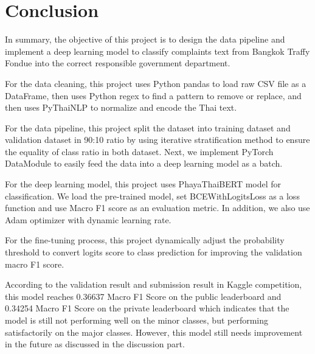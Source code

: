 \documentclass[12pt, a4paper]{article}
\begin{document}
    \pagebreak

    \part{Conclusion}
        In summary, the objective of this project is to design the data pipeline and implement a deep learning model to classify
        complaints text from Bangkok Traffy Fondue into the correct responsible government department.

        \vspace{1em}

        For the data cleaning, this project uses Python pandas to load raw CSV file as a DataFrame,
        then uses Python regex to find a pattern to remove or replace, and then uses PyThaiNLP to normalize
        and encode the Thai text.

        \vspace{1em}

        For the data pipeline, this project split the dataset into training dataset and validation dataset in 90:10 ratio
        by using iterative stratification method to ensure the equality of class ratio in both dataset.
        Next, we implement PyTorch DataModule to easily feed the data into a deep learning model as a batch.

        \vspace{1em}

        For the deep learning model, this project uses PhayaThaiBERT model for classification. We load the pre-trained model,
        set BCEWithLogitsLoss as a loss function and use Macro F1 score as an evaluation metric.
        In addition, we also use Adam optimizer with dynamic learning rate.

        \vspace{1em}

        For the fine-tuning process, this project dynamically adjust the probability threshold to convert logits score to class prediction
        for improving the validation macro F1 score.

        \vspace{1em}
        According to the validation result and submission result in Kaggle competition,
        this model reaches 0.36637 Macro F1 Score on the public leaderboard
        and 0.34254 Macro F1 Score on the private leaderboard which indicates that the model
        is still not performing well on the minor classes, but performing satisfactorily on the major classes.
        However, this model still needs improvement in the future as discussed in the discussion part.
\end{document}
